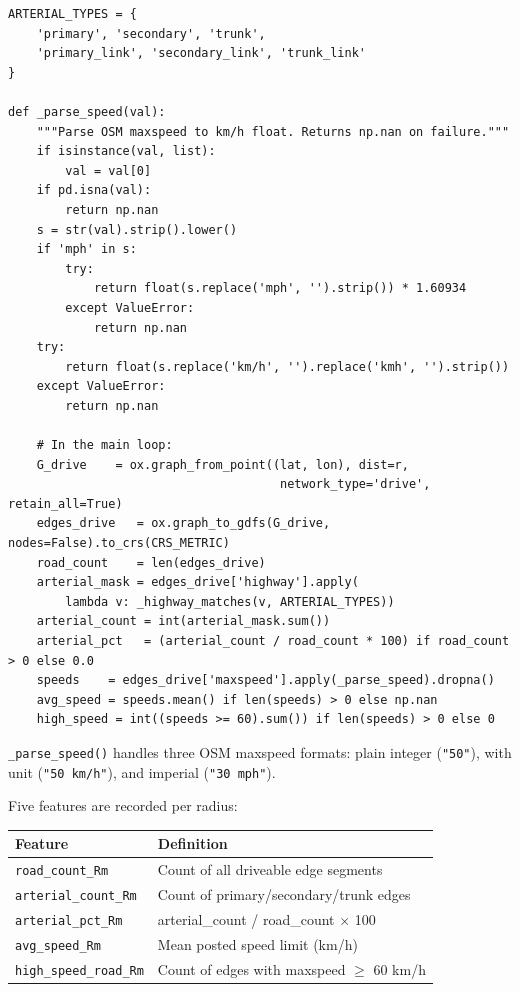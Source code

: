 \documentclass[11pt,a4paper,openany]{book}
\begin{document}
\begin{lstlisting}[style=python, caption={Road network and speed parsing per radius.}]
ARTERIAL_TYPES = {
    'primary', 'secondary', 'trunk',
    'primary_link', 'secondary_link', 'trunk_link'
}

def _parse_speed(val):
    """Parse OSM maxspeed to km/h float. Returns np.nan on failure."""
    if isinstance(val, list):
        val = val[0]
    if pd.isna(val):
        return np.nan
    s = str(val).strip().lower()
    if 'mph' in s:
        try:
            return float(s.replace('mph', '').strip()) * 1.60934
        except ValueError:
            return np.nan
    try:
        return float(s.replace('km/h', '').replace('kmh', '').strip())
    except ValueError:
        return np.nan

    # In the main loop:
    G_drive    = ox.graph_from_point((lat, lon), dist=r,
                                      network_type='drive', retain_all=True)
    edges_drive   = ox.graph_to_gdfs(G_drive, nodes=False).to_crs(CRS_METRIC)
    road_count    = len(edges_drive)
    arterial_mask = edges_drive['highway'].apply(
        lambda v: _highway_matches(v, ARTERIAL_TYPES))
    arterial_count = int(arterial_mask.sum())
    arterial_pct   = (arterial_count / road_count * 100) if road_count > 0 else 0.0
    speeds    = edges_drive['maxspeed'].apply(_parse_speed).dropna()
    avg_speed = speeds.mean() if len(speeds) > 0 else np.nan
    high_speed = int((speeds >= 60).sum()) if len(speeds) > 0 else 0
\end{lstlisting}

\texttt{\_parse\_speed()} handles three OSM maxspeed formats: plain integer (\texttt{"50"}), with unit (\texttt{"50 km/h"}), and imperial (\texttt{"30 mph"}).

Five features are recorded per radius:

\begin{center}
\begin{tabular}{L{5.5cm} L{7.5cm}}
\toprule
\textbf{Feature} & \textbf{Definition} \\
\midrule
\texttt{road\_count\_Rm}       & Count of all driveable edge segments \\
\texttt{arterial\_count\_Rm}   & Count of primary/secondary/trunk edges \\
\texttt{arterial\_pct\_Rm}     & arterial\_count / road\_count $\times$ 100 \\
\texttt{avg\_speed\_Rm}        & Mean posted speed limit (km/h) \\
\texttt{high\_speed\_road\_Rm} & Count of edges with maxspeed $\geq$ 60 km/h \\
\bottomrule
\end{tabular}
\end{center}
\end{document}
